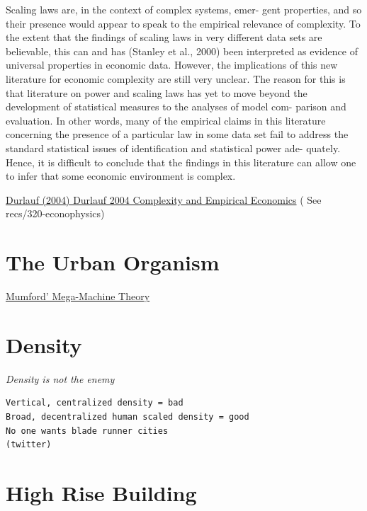 \documentclass[
]{book}
\begin{document}
Scaling laws are, in the context of complex systems, emer-
gent properties, and so their presence would appear to speak to the empirical
relevance of complexity.
To the extent that the findings of scaling laws in very
different data sets are believable, this can and has (Stanley et al., 2000) been
interpreted as evidence of universal properties in economic data. However, the
implications of this new literature for economic complexity are still very unclear.
The reason for this is that literature on power and scaling laws has yet to move
beyond the development of statistical measures to the analyses of model com-
parison and evaluation.
In other words, many of the empirical claims in this
literature concerning the presence of a particular law in some data set fail to
address the standard statistical issues of identification and statistical power ade-
quately. Hence, it is difficult to conclude that the findings in this literature can
allow one to infer that some economic environment is complex.

\href{pdf/Durlauf_2004_Complex\%20ity_and_Empirical_Economics.pdf}{Durlauf (2004) Durlauf 2004 Complexity and Empirical Economics} ( See recs/320-econophysics)

\hypertarget{the-urban-organism}{%
\chapter{The Urban Organism}\label{the-urban-organism}}

\href{https://capitalaspower.com/casp-forum/topic/questions-regarding-mumfords-theory-of-the-mega-machine/\#post-245381}{Mumford' Mega-Machine Theory}

\hypertarget{density}{%
\chapter{Density}\label{density}}

\emph{Density is not the enemy}

\begin{verbatim}
Vertical, centralized density = bad
Broad, decentralized human scaled density = good
No one wants blade runner cities
(twitter)
\end{verbatim}

\hypertarget{high-rise-building}{%
\chapter{High Rise Building}\label{high-rise-building}}
\end{document}
